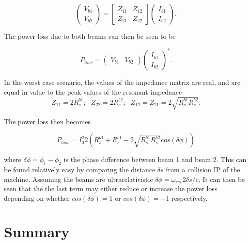 \documentclass[12pt,a4paper,twopage,openright]{report}
\begin{document}
\begin{equation}
\begin{pmatrix}
V_{b1} \\
V_{b2}
\end{pmatrix}
=
\begin{bmatrix}
Z_{11} & Z_{12} \\
Z_{21} & Z_{22}
\end{bmatrix}
\begin{pmatrix}
I_{b1} \\
I_{b2}
\end{pmatrix}.
\end{equation}

The power loss due to both beams can then be seen to be

\begin{equation}
P_{loss} = \begin{pmatrix}
V_{b1} & V_{b2}
\end{pmatrix}
\begin{pmatrix}
I_{b1} \\
I_{b2}
\end{pmatrix}^{*}.
\end{equation}

In the worst case scenario, the values of the impedance matrix are real, and are equal in value to the peak values of the resonant impedance
\begin{equation}
Z_{11} = 2R^{b1}_{s};\text{    } Z_{22} = 2R^{b2}_{s};\text{    }  Z_{12} = Z_{21} = 2 \sqrt{R^{b1}_{s}R^{b2}_{s}}.
\end{equation}

The power loss then becomes

\begin{equation}
P_{loss} = I_{0}^{2} 2 \left( R_{s}^{b1} +  R_{s}^{b1} - 2\sqrt{R^{b1}_{s}R^{b2}_{s}} cos \left( \delta \phi \right) \right)
\end{equation}

where $\delta \phi = \phi_{1} - \phi_{2}$ is the phase difference between beam 1 and beam 2. This can be found relatively easy by comparing the distance $\delta s$ from a collision IP of the machine. Assuming the beams are ultrarelativistic $\delta \phi = \omega_{rev} 2  \delta s /c$. It can then be seen that the the last term may either reduce or increase the power loss depending on whether $cos\left( \delta \phi \right) = 1$ or $cos\left( \delta \phi \right) = -1$ respectively.

\section{Summary}
\end{document}
